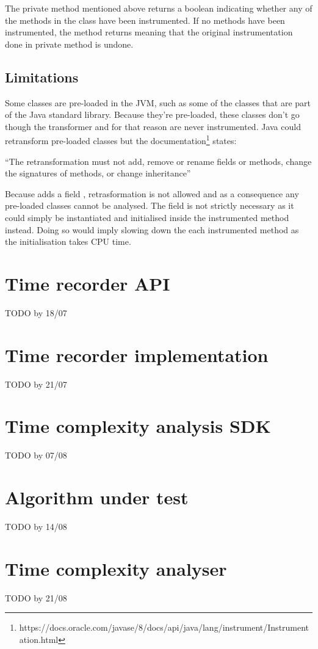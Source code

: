 \noindent The private method  mentioned above returns a boolean indicating whether any of the methods in the class have been instrumented. If no methods have been instrumented, the  method returns  meaning that the original instrumentation done in private method  is undone.

\subsection{Limitations}
\label{sec:implementation:agent:limitations}
Some classes are pre-loaded in the JVM, such as some of the classes that are part of the Java standard library. Because they're pre-loaded, these classes don't go though the transformer and for that reason are never instrumented. Java could retransform pre-loaded classes but the documentation\footnote{https://docs.oracle.com/javase/8/docs/api/java/lang/instrument/Instrumentation.html} states:

\enquote{The retransformation must not add, remove or rename fields or methods, change the signatures of methods, or change inheritance}

\noindent Because  adds a field , retrasformation is not allowed and as a consequence any pre-loaded classes cannot be analysed. The field is not strictly necessary as it could simply be instantiated and initialised inside the instrumented method instead. Doing so would imply slowing down the each instrumented method as the initialisation takes CPU time.

\section{Time recorder API}
\label{sec:implementation:timerecorderapi}

TODO by 18/07


\section{Time recorder implementation}
\label{sec:implementation:timerecorderimplementation}

TODO by 21/07


\section{Time complexity analysis SDK}

TODO by 07/08


\section{Algorithm under test}

TODO by 14/08


\section{Time complexity analyser}
\label{sec:implementation:timecomplexityanalyser} 
TODO by 21/08
